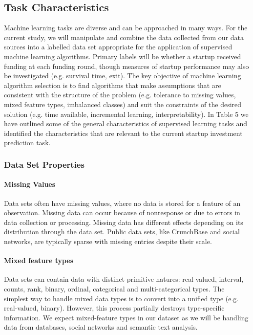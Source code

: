 \documentclass[../thesis/thesis.tex]{subfiles}
\begin{document}
\subsection{Task Characteristics}

Machine learning tasks are diverse and can be approached in many ways. For the current study, we will manipulate and combine the data collected from our data sources into a labelled data set appropriate for the application of supervised machine learning algorithms. Primary labels will be whether a startup received funding at each funding round, though measures of startup performance may also be investigated (e.g. survival time, exit). The key objective of machine learning algorithm selection is to find algorithms that make assumptions that are consistent with the structure of the problem (e.g. tolerance to missing values, mixed feature types, imbalanced classes) and suit the constraints of the desired solution (e.g. time available, incremental learning, interpretability). In Table 5 we have outlined some of the general characteristics of supervised learning tasks and identified the characteristics that are relevant to the current startup investment prediction task.


\label{fig:litreview:algorithms:task}

\subsubsection{Data Set Properties}

\paragraph{Missing Values} Data sets often have missing values, where no data is stored for a feature of an observation. Missing data can occur because of nonresponse or due to errors in data collection or processing. Missing data has different effects depending on its distribution through the data set. Public data sets, like CrunchBase and social networks, are typically sparse with missing entries despite their scale.

\paragraph{Mixed feature types} Data sets can contain data with distinct primitive natures: real-valued, interval, counts, rank, binary, ordinal, categorical and multi-categorical types. The simplest way to handle mixed data types is to convert into a unified type (e.g. real-valued, binary). However, this process partially destroys type-specific information. We expect mixed-feature types in our dataset as we will be handling data from databases, social networks and semantic text analysis.
\end{document}

